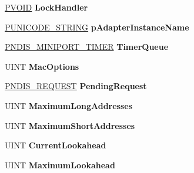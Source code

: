 \begin{DoxyCompactItemize}
\hyperlink{interfacevoid}{P\+V\+O\+ID} {\bfseries Lock\+Handler}
\item 
\mbox{\label{struct___n_d_i_s___m_i_n_i_p_o_r_t___b_l_o_c_k_aca79a07806e608586665c38a3eb40f5e}} 
\hyperlink{struct___u_n_i_c_o_d_e___s_t_r_i_n_g}{P\+U\+N\+I\+C\+O\+D\+E\+\_\+\+S\+T\+R\+I\+NG} {\bfseries p\+Adapter\+Instance\+Name}
\item 
\mbox{\label{struct___n_d_i_s___m_i_n_i_p_o_r_t___b_l_o_c_k_adaa66ce579c3eccd811e97f0b9c4a150}} 
\hyperlink{struct___n_d_i_s___m_i_n_i_p_o_r_t___t_i_m_e_r}{P\+N\+D\+I\+S\+\_\+\+M\+I\+N\+I\+P\+O\+R\+T\+\_\+\+T\+I\+M\+ER} {\bfseries Timer\+Queue}
\item 
\mbox{\label{struct___n_d_i_s___m_i_n_i_p_o_r_t___b_l_o_c_k_a189166ae47d205183885774ed1331c54}} 
U\+I\+NT {\bfseries Mac\+Options}
\item 
\mbox{\label{struct___n_d_i_s___m_i_n_i_p_o_r_t___b_l_o_c_k_a3948be027631b8d6428d4cbcec72f493}} 
\hyperlink{struct___n_d_i_s___r_e_q_u_e_s_t}{P\+N\+D\+I\+S\+\_\+\+R\+E\+Q\+U\+E\+ST} {\bfseries Pending\+Request}
\item 
\mbox{\label{struct___n_d_i_s___m_i_n_i_p_o_r_t___b_l_o_c_k_ae075477ee6b05fb46e918b5a1ec06ff3}} 
U\+I\+NT {\bfseries Maximum\+Long\+Addresses}
\item 
\mbox{\label{struct___n_d_i_s___m_i_n_i_p_o_r_t___b_l_o_c_k_a38b0debf0ad06bbe30769fa120fb93c5}} 
U\+I\+NT {\bfseries Maximum\+Short\+Addresses}
\item 
\mbox{\label{struct___n_d_i_s___m_i_n_i_p_o_r_t___b_l_o_c_k_ab5d8438ba749ca41481a3fc4f142d4af}} 
U\+I\+NT {\bfseries Current\+Lookahead}
\item 
\mbox{\label{struct___n_d_i_s___m_i_n_i_p_o_r_t___b_l_o_c_k_acd072fee81ca87d6ddc8011b5285935c}} 
U\+I\+NT {\bfseries Maximum\+Lookahead}
\item 

\end{DoxyCompactItemize}
